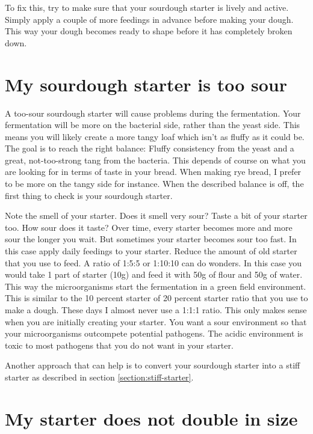 To fix this, try to make sure that your sourdough starter is lively
and active. Simply apply a couple of more feedings in advance before
making your dough. This way your dough becomes ready to shape
before it has completely broken down.

\section{My sourdough starter is too sour}

A too-sour sourdough starter will cause problems during
the fermentation. Your fermentation will be more on the
bacterial side, rather than the yeast side. This means
you will likely create a more tangy loaf which isn't
as fluffy as it could be. The goal is to reach the right
balance: Fluffy consistency from the yeast and a great,
not-too-strong tang from the bacteria. This depends
of course on what you are looking for in terms of taste
in your bread. When making rye bread, I prefer to be more
on the tangy side for instance. When the described balance
is off, the first thing to check is your sourdough starter.

Note the smell of your starter. Does it smell very sour?
Taste a bit of your starter too. How sour does it taste?
Over time, every starter becomes more and more sour the longer
you wait. But sometimes your starter becomes sour too fast.
In this case apply daily feedings to your starter. Reduce
the amount of old starter that you use to feed. A ratio
of 1:5:5 or 1:10:10 can do wonders. In this case you would
take 1 part of starter (10g) and feed it with 50g of flour
and 50g of water. This way the microorganisms start
the fermentation in a green field environment. This is
similar to the 10 percent starter of 20 percent starter
ratio that you use to make a dough. These days I almost
never use a 1:1:1 ratio. This only makes sense when you
are initially creating your starter. You want a sour
environment so that your microorganisms outcompete
potential pathogens. The acidic environment is toxic
to most pathogens that you do not want in your starter.

Another approach that can help is to convert your
sourdough starter into a stiff starter as
described in section \ref{section:stiff-starter}.

\section{My starter does not double in size}

